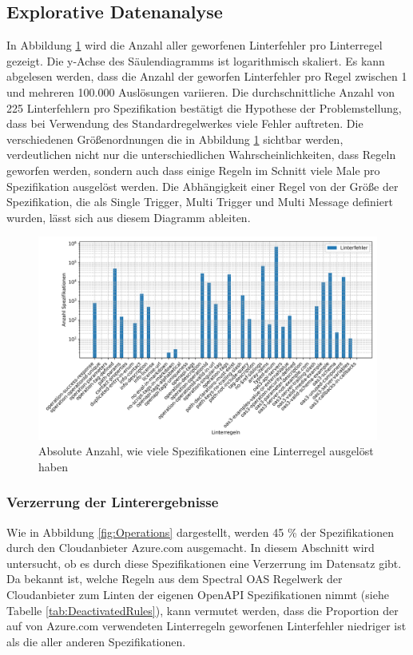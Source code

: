 \subsection{Explorative Datenanalyse} \label{sec:explorativeanalyse}
In Abbildung \ref{fig:totalspecthrownbarplot} wird die Anzahl aller geworfenen Linterfehler pro Linterregel gezeigt. Die y-Achse des Säulendiagramms ist logarithmisch skaliert. Es kann abgelesen werden, dass die Anzahl der geworfen Linterfehler pro Regel zwischen 1 und mehreren 100.000 Auslösungen variieren. Die durchschnittliche Anzahl von 225 Linterfehlern pro Spezifikation bestätigt die Hypothese der Problemstellung, dass bei Verwendung des Standardregelwerkes viele Fehler auftreten. Die verschiedenen Größenordnungen die in Abbildung \ref{fig:totalspecthrownbarplot} sichtbar werden, verdeutlichen nicht nur die unterschiedlichen Wahrscheinlichkeiten, dass Regeln geworfen werden, sondern auch dass einige Regeln im Schnitt viele Male pro Spezifikation ausgelöst werden. Die Abhängigkeit einer Regel von der Größe der Spezifikation, die als Single Trigger, Multi Trigger und Multi Message definiert wurden, lässt sich aus diesem Diagramm ableiten.

\begin{figure}[htbp]
  \centering
  \includegraphics[width=1\linewidth]{img/totalspecthrownbarplot.png}
  \caption{Absolute Anzahl, wie viele Spezifikationen eine Linterregel ausgelöst haben}
  \label{fig:totalspecthrownbarplot}
\end{figure}


\subsubsection{Verzerrung der Linterergebnisse} \label{sec:verzerrungdesdatensatzes}
Wie in Abbildung \ref{fig:Operations} dargestellt, werden 45 \% der Spezifikationen durch den Cloudanbieter Azure.com ausgemacht. In diesem Abschnitt wird untersucht, ob es durch diese Spezifikationen eine Verzerrung im Datensatz gibt. Da bekannt ist, welche Regeln aus dem Spectral \acs{OAS} Regelwerk der Cloudanbieter zum Linten der eigenen OpenAPI Spezifikationen nimmt (siehe Tabelle \ref{tab:DeactivatedRules}), kann vermutet werden, dass die Proportion der auf von Azure.com verwendeten Linterregeln geworfenen Linterfehler niedriger ist als die aller anderen Spezifikationen.


